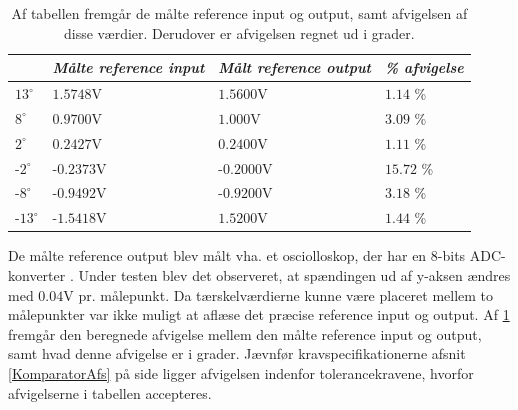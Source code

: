 \begin{table}[H]
\centering
\begin{tabular}{|l|l|l|l|}
\hline
           & \textit{Målte reference input} & \textit{Målt reference output} & \textit{\% afvigelse} \\ \hline
$13^\circ$  & $1.5748$V                      & $1.5600$V                      & $1.14$ \%              \\ \hline
$8^\circ$   & $0.9700$V                      & $1.000$V                       & $3.09$ \%              \\ \hline
$2^\circ$   & $0.2427$V                      & $0.2400$V                      & $1.11$ \%                                    \\ \hline
-$2^\circ$  & -$0.2373$V                     & -$0.2000$V                     & $15.72$ \%                                \\ \hline
-$8^\circ$  & -$0.9492$V                     & -$0.9200$V                     & $3.18$ \%              \\ \hline
-$13^\circ$ & -$1.5418$V                     & $1.5200$V                      & $1.44$ \%              \\ \hline
\end{tabular}
\caption{Af tabellen fremgår de målte reference input og output, samt afvigelsen af disse værdier. Derudover er afvigelsen regnet ud i grader.}
\label{Tab:test-taendsluk}
\end{table}

\noindent De målte reference output blev målt vha. et osciolloskop, der har en 8-bits ADC-konverter \cite{RIGOL2010}. Under testen blev det observeret, at spændingen ud af y-aksen  ændres med $0.04$V pr. målepunkt. Da tærskelværdierne kunne være placeret mellem to målepunkter var ikke muligt at aflæse det præcise reference input og output. Af \ref{Tab:test-taendsluk} fremgår den beregnede afvigelse mellem den målte reference input og output, samt hvad denne afvigelse er i grader. Jævnfør kravspecifikationerne afsnit \ref{KomparatorAfs} på side \pageref{KomparatorAfs} ligger afvigelsen indenfor tolerancekravene, hvorfor afvigelserne i tabellen accepteres. 